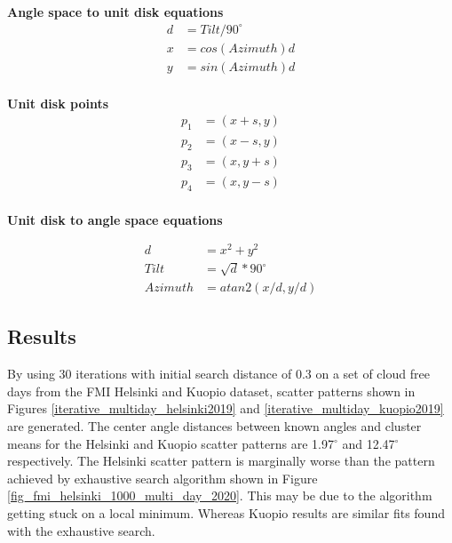 \noindent \textbf{Angle space to unit disk equations}
\begin{equation}
\begin{split}
\label{angle_space_to_unit_circle}
d &= Tilt/90^\circ \\
x &= cos(Azimuth)d \\
y &= sin(Azimuth)d \\
\end{split}
\end{equation}


\noindent \textbf{Unit disk points}
\begin{equation}
\begin{split}
\label{local_lattice_from_xy}
p_1 &= (x+s,y) \\
p_2 &= (x-s,y) \\
p_3 &= (x,y+s) \\
p_4 &= (x,y-s) \\
\end{split}
\end{equation}

\noindent \textbf{Unit disk to angle space equations}

\begin{equation}
\begin{split}
\label{unit_circle_to_angle_space}
d &= x^2+y^2\\
Tilt &= \sqrt{d}*90^\circ\\
Azimuth &= atan2(x/d, y/d)
\end{split}
\end{equation}

\pagebreak

\subsection{Results}
By using 30 iterations with initial search distance of 0.3 on a set of cloud free days from the FMI Helsinki and Kuopio dataset, scatter patterns shown in Figures \ref{iterative_multiday_helsinki2019} and \ref{iterative_multiday_kuopio2019} are generated. The center angle distances between known angles and cluster means for the Helsinki and Kuopio scatter patterns are 1.97$^\circ$ and 12.47$^\circ$ respectively. The Helsinki scatter pattern is marginally worse than the pattern achieved by exhaustive search algorithm shown in Figure \ref{fig_fmi_helsinki_1000_multi_day_2020}. This may be due to the algorithm getting stuck on a local minimum. Whereas Kuopio results are similar fits found with the exhaustive search. 


